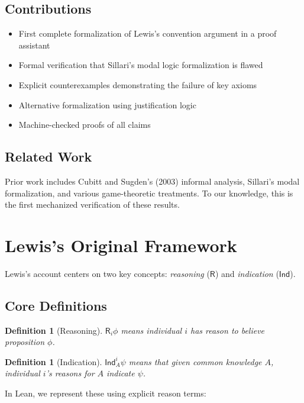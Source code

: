 \documentclass[11pt]{article}
\newtheorem{definition}[theorem]{Definition}
\newcommand{\Roperator}{\mathsf{R}}
\newcommand{\Ind}{\mathsf{Ind}}
\begin{document}
\subsection{Contributions}

\begin{itemize}
\item First complete formalization of Lewis's convention argument in a proof assistant
\item Formal verification that Sillari's modal logic formalization is flawed
\item Explicit counterexamples demonstrating the failure of key axioms
\item Alternative formalization using justification logic
\item Machine-checked proofs of all claims
\end{itemize}

\subsection{Related Work}

Prior work includes Cubitt and Sugden's (2003) informal analysis, Sillari's modal 
formalization, and various game-theoretic treatments. To our knowledge, this is 
the first mechanized verification of these results.

\section{Lewis's Original Framework}

Lewis's account centers on two key concepts: \emph{reasoning} ($\Roperator$) and 
\emph{indication} ($\Ind$).

\subsection{Core Definitions}

\begin{definition}[Reasoning]
$\Roperator_i \phi$ means individual $i$ has reason to believe proposition $\phi$.
\end{definition}

\begin{definition}[Indication]
$\Ind_A^i \psi$ means that given common knowledge $A$, individual $i$'s reasons 
for $A$ indicate $\psi$.
\end{definition}

In Lean, we represent these using explicit reason terms:
\end{document}
